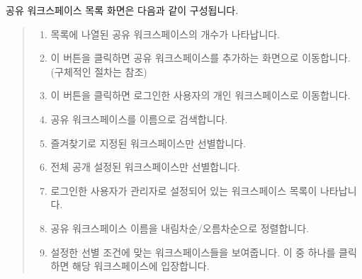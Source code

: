 \documentclass[letterpaper,10pt,english]{sphinxmanual}
\begin{document}
공유 워크스페이스 목록 화면은 다음과 같이 구성됩니다.
\begin{quote}

\begin{figure}[H]
\centering

\noindent{}
\end{figure}
\begin{enumerate}
\def\theenumi{\arabic{enumi}}
\def\labelenumi{\theenumi .}
\makeatletter\def\p@enumii{\p@enumi \theenumi .}\makeatother
\item {} 
 목록에 나열된 공유 워크스페이스의 개수가 나타납니다.

\item {} 
 이 버튼을 클릭하면 공유 워크스페이스를 추가하는 화면으로 이동합니다. (구체적인 절차는 {\hyperref[\detokenize{discovery/part03/shared_workspace:shared-workspace-creation}]{}} 참조)

\item {} 
 이 버튼을 클릭하면 로그인한 사용자의 개인 워크스페이스로 이동합니다.

\item {} 
 공유 워크스페이스를 이름으로 검색합니다.

\item {} 
 즐겨찾기로 지정된 워크스페이스만 선별합니다.

\item {} 
 전체 공개 설정된 워크스페이스만 선별합니다.

\item {} 
 로그인한 사용자가 관리자로 설정되어 있는 워크스페이스 목록이 나타납니다.

\item {} 
 공유 워크스페이스 이름을 내림차순/오름차순으로 정렬합니다.

\item {} 
 설정한 선별 조건에 맞는 워크스페이스들을 보여줍니다. 이 중 하나를 클릭하면 해당 워크스페이스에 입장합니다.

\end{enumerate}
\end{quote}
\end{document}
